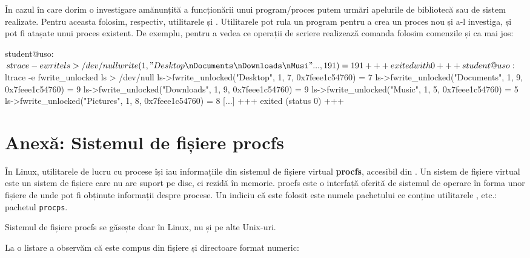 În cazul în care dorim o investigare amănunțită a funcționării unui
program/proces putem urmări apelurile de bibliotecă sau de sistem realizate.
Pentru aceasta folosim, respectiv, utilitarele  și . Utilitarele pot
rula un program pentru a crea un proces nou și a-l investiga, și pot fi atașate
unui proces existent. De exemplu, pentru a vedea ce operații de scriere realizează comanda  folosim comenzile  și  ca mai jos:

\begin{screen}
student@uso:~$ strace -e write ls > /dev/null
write(1, "Desktop\nDocuments\nDownloads\nMusi"..., 191) = 191
+++ exited with 0 +++
student@uso:~$ ltrace -e fwrite_unlocked ls > /dev/null
ls->fwrite_unlocked("Desktop", 1, 7, 0x7feee1c54760)                                                          = 7
ls->fwrite_unlocked("Documents", 1, 9, 0x7feee1c54760)                                                        = 9
ls->fwrite_unlocked("Downloads", 1, 9, 0x7feee1c54760)                                                        = 9
ls->fwrite_unlocked("Music", 1, 5, 0x7feee1c54760)                                                            = 5
ls->fwrite_unlocked("Pictures", 1, 8, 0x7feee1c54760)                                                         = 8
[...]
+++ exited (status 0) +++
\end{screen}

\section{Anexă: Sistemul de fișiere procfs}
\label{sec:procese-proc}

În Linux, utilitarele de lucru cu procese își iau informațiile din sistemul de
fișiere virtual \textbf{procfs}, accesibil din . Un sistem de fișiere virtual este
un sistem de fișiere care nu are suport pe disc, ci rezidă în memorie. procfs
este o interfață oferită de sistemul de operare în forma unor fișiere de unde
pot fi obținute informații despre procese. Un indiciu că este folosit este
numele pachetului ce conține utilitarele ,  etc.: pachetul \texttt{procps}.

\begin{note}
Sistemul de fișiere procfs se găsește doar în Linux, nu și pe alte Unix-uri.
\end{note}

La o listare a  observăm că este compus din fișiere și directoare format numeric:

